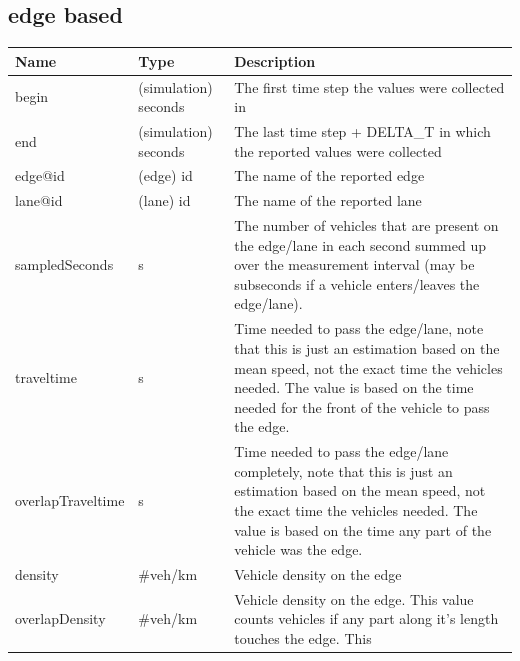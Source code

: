 \documentclass[
  letterpaper,
  DIV=11,
  numbers=noendperiod]{scrreprt}
\newcounter{none} %
\begin{document}
\subsection{edge based}\label{edge-based}

{\def\LTcaptype{none} %
\begin{longtable}[]{@{}
  >{\raggedright\arraybackslash}p{}
  >{\raggedright\arraybackslash}p{}
  >{\raggedright\arraybackslash}p{}@{}}
\toprule\noalign{}
\begin{minipage}[b]{\linewidth}\raggedright
Name
\end{minipage} & \begin{minipage}[b]{\linewidth}\raggedright
Type
\end{minipage} & \begin{minipage}[b]{\linewidth}\raggedright
Description
\end{minipage} \\
\midrule\noalign{}
\endhead
\bottomrule\noalign{}
\endlastfoot
begin & (simulation) seconds & The first time step the values were
collected in \\
end & (simulation) seconds & The last time step + DELTA\_T in which the
reported values were collected \\
edge@id & (edge) id & The name of the reported edge \\
lane@id & (lane) id & The name of the reported lane \\
sampledSeconds & s & The number of vehicles that are present on the
edge/lane in each second summed up over the measurement interval (may be
subseconds if a vehicle enters/leaves the edge/lane). \\
traveltime & s & Time needed to pass the edge/lane, note that this is
just an estimation based on the mean speed, not the exact time the
vehicles needed. The value is based on the time needed for the front of
the vehicle to pass the edge. \\
overlapTraveltime & s & Time needed to pass the edge/lane completely,
note that this is just an estimation based on the mean speed, not the
exact time the vehicles needed. The value is based on the time any part
of the vehicle was the edge. \\
density & \#veh/km & Vehicle density on the edge \\
overlapDensity & \#veh/km & Vehicle density on the edge. This value
counts vehicles if any part along it's length touches the edge. This

\end{longtable}}
\end{document}
